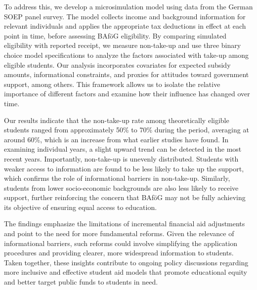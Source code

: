 
To address this, we develop a microsimulation model using data from the German SOEP panel survey. The model collects income and background information for relevant individuals and applies the appropriate tax deductions in effect at each point in time, before assessing BAföG eligibility. By comparing simulated eligibility with reported receipt, we measure non-take-up and use three binary choice model specifications to analyze the factors associated with take-up among eligible students. Our analysis incorporates covariates for expected subsidy amounts, informational constraints, and proxies for attitudes toward government support, among others. This framework allows us to isolate the relative importance of different factors and examine how their influence has changed over time.

Our results indicate that the non-take-up rate among theoretically eligible students ranged from approximately 50\% to 70\% during the period, averaging at around 60\%, which is an increase from what earlier studies have found. In examining individual years, a slight upward trend can be detected in the most recent years. Importantly, non-take-up is unevenly distributed. Students with weaker access to information are found to be less likely to take up the support, which confirms the role of informational barriers in non-take-up. Similarly, students from lower socio-economic backgrounds are also less likely to receive support, further reinforcing the concern that BAföG may not be fully achieving its objective of ensuring equal access to education.


The findings emphasize the limitations of incremental financial aid adjustments and point to the need for more fundamental reforms. Given the relevance of informational barriers, such reforms could involve simplifying the application procedures and providing clearer, more widespread information to students. Taken together, these insights contribute to ongoing policy discussions regarding more inclusive and effective student aid models that promote educational equity and better target public funds to students in need.

